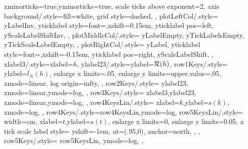 {{{              xminorticks=true,yminorticks=true,
              scale ticks above exponent=2,
              axis background/.style={fill=white},
              grid style={dashed},
            },
            plotLeftCol/.style={
              yLabelInv,
              yticklabel style={font=\textsize{\tickSize},xshift=0.15em},
              yticklabel pos=left,
              yScaleLabelShiftInv,
            },
            plotMiddleCol/.style={
              yLabelEmpty,
              yTickLabelsEmpty,
              yTickScaleLabelEmpty,
            },
            plotRightCol/.style={
              yLabel,
              yticklabel style={font=\textsize{\tickSize},xshift=-0.15em},
              yticklabel pos=right,
              yScaleLabelShift,
            },
            xlabel3/.style={xlabel={\(h\)}},
            ylabel23/.style={ylabel={\(\operatorname{\mathcal R}(h)\)}},
            row1Keys/.style={
              ylabel={\(\bar l_N(h)\)},
              enlarge x limits=.05,
              enlarge y limits={upper,value=.05},
              xmode=linear,
              log origin=infty,
            },
            row2Keys/.style={
              ylabel23,
              xmode=linear,ymode=log,
            },
            row3Keys/.style={
              xlabel3,ylabel23,
              xmode=linear,ymode=log,
            },
            row4KeysLin/.style={
              xlabel={\(k\)},ylabel={\(s(k)\)},
              xmode=log,
            },
            row4Keys/.style={row4KeysLin,ymode=log},
            row5KeysLin/.style={
              width=\plotLastWidth cm,
              xlabel={\(t\)},ylabel={\(s(t)\)},
              enlarge x limits=0,
              enlarge y limits=0.05,
              x tick scale label style={
                yshift=-1em,
                at={(.95,0)},
                anchor=north,
              },
            },
            row5Keys/.style={
              row5KeysLin,
              ymode=log,
            },
          }
      }

